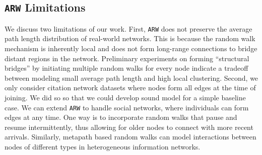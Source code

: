 \subsection{\texttt{ARW} Limitations}
We discuss two limitations of our work. First, \texttt{ARW} does not preserve the average
path length distribution of real-world networks. This is because the random walk
mechanism is inherently local and does not form long-range connections to bridge
distant regions in the network. Preliminary experiments on forming ``structural bridges''
by initiating multiple random walks for every node indicate a tradeoff
between modeling small average path length and high local clustering. Second,
we only consider citation network datasets where nodes form all edges at the time of joining. We did so so that we could develop sound model for a simple baseline case. We can extend \texttt{ARW} to handle social networks, where individuals can form edges at any time. One way is to incorporate random walks that pause and resume intermittently, thus allowing for older nodes to connect with more recent arrivals.
Similarly, metapath based random walks can model interactions between
nodes of different types in heterogeneous information networks.


